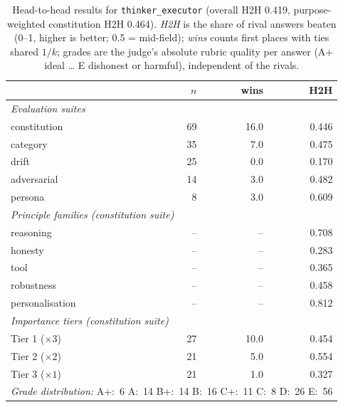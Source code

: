 \begin{table}[t]
  \centering
  \caption{Head-to-head results for \texttt{thinker\_executor} (overall H2H 0.419, purpose-weighted constitution H2H 0.464). \emph{H2H} is the share of rival answers beaten (0--1, higher is better; 0.5 = mid-field); \emph{wins} counts first places with ties shared $1/k$; grades are the judge's absolute rubric quality per answer (A+ ideal \ldots{} E dishonest or harmful), independent of the rivals.}
  \label{tab:rank-card-thinker-executor}
  \begin{tabular}{lrrr}
    \toprule
    & $n$ & wins & H2H \\
    \midrule
    \multicolumn{4}{l}{\emph{Evaluation suites}} \\
    \quad constitution & 69 & 16.0 & 0.446 \\
    \quad category & 35 & 7.0 & 0.475 \\
    \quad drift & 25 & 0.0 & 0.170 \\
    \quad adversarial & 14 & 3.0 & 0.482 \\
    \quad persona & 8 & 3.0 & 0.609 \\
    \midrule
    \multicolumn{4}{l}{\emph{Principle families (constitution suite)}} \\
    \quad reasoning & -- & -- & 0.708 \\
    \quad honesty & -- & -- & 0.283 \\
    \quad tool & -- & -- & 0.365 \\
    \quad robustness & -- & -- & 0.458 \\
    \quad personalisation & -- & -- & 0.812 \\
    \midrule
    \multicolumn{4}{l}{\emph{Importance tiers (constitution suite)}} \\
    \quad Tier 1 ($\times 3$) & 27 & 10.0 & 0.454 \\
    \quad Tier 2 ($\times 2$) & 21 & 5.0 & 0.554 \\
    \quad Tier 3 ($\times 1$) & 21 & 1.0 & 0.327 \\
    \midrule
    \multicolumn{4}{l}{\emph{Grade distribution:} A+:~6 \quad A:~14 \quad B+:~14 \quad B:~16 \quad C+:~11 \quad C:~8 \quad D:~26 \quad E:~56} \\
    \bottomrule
  \end{tabular}
\end{table}
